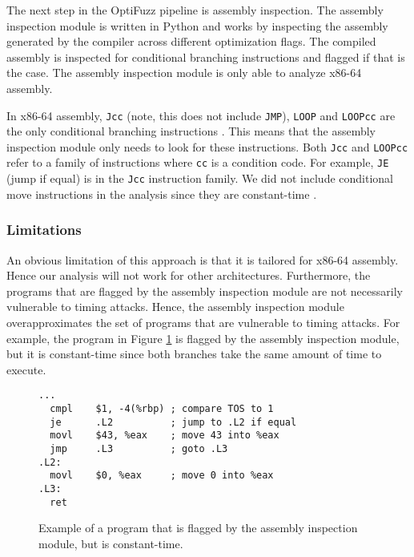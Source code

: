 The next step in the OptiFuzz pipeline is assembly inspection.
The assembly inspection module is written in Python and works by inspecting the assembly generated by the compiler across different optimization flags.
The compiled assembly is inspected for conditional branching instructions and flagged if that is the case.
The assembly inspection module is only able to analyze x86-64 assembly.

In x86-64 assembly, \texttt{Jcc} (note, this does not include \texttt{JMP}), \texttt{LOOP} and \texttt{LOOPcc} are the only conditional branching instructions \citep{intel-reference}.
This means that the assembly inspection module only needs to look for these instructions.
Both \texttt{Jcc} and \texttt{LOOPcc} refer to a family of instructions where \texttt{cc} is a condition code.
For example, \texttt{JE} (jump if equal) is in the \texttt{Jcc} instruction family. 
We did not include conditional move instructions in the analysis since they are constant-time \citep{cmov-is-constant-time}.

\subsubsection{Limitations}
An obvious limitation of this approach is that it is tailored for x86-64 assembly.
Hence our analysis will not work for other architectures.
Furthermore, the programs that are flagged by the assembly inspection module are not necessarily vulnerable to timing attacks.
Hence, the assembly inspection module overapproximates the set of programs that are vulnerable to timing attacks.
For example, the program in Figure \ref{fig:assembly-inspection-example} is flagged by the assembly inspection module, but it is constant-time since both branches take the same amount of time to execute.

\begin{figure}[H]
  \centering
  \begin{lstlisting}[style=defstyle, language={[x86masm]Assembler}, xleftmargin=4cm, xrightmargin=4cm]
...
  cmpl    $1, -4(%rbp) ; compare TOS to 1
  je      .L2          ; jump to .L2 if equal
  movl    $43, %eax    ; move 43 into %eax
  jmp     .L3          ; goto .L3
.L2:
  movl    $0, %eax     ; move 0 into %eax
.L3:
  ret\end{lstlisting}
  \caption{Example of a program that is flagged by the assembly inspection module, but is constant-time.}
  \label{fig:assembly-inspection-example}
\end{figure}

